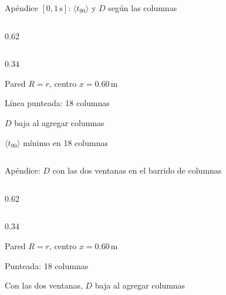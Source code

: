 \documentclass[aspectratio=169,10pt]{beamer}
\begin{document}
\begin{frame}[noframenumbering]{Apéndice $[0, 1\,\mathrm{s}]$: $\langle t_{90}\rangle$ y $D$ según las columnas}
  \begin{cols}
    \begin{column}{0.62\textwidth}
    \end{column}
    \begin{column}{0.34\textwidth}
      \begin{parametros}
        \item Pared $R = r$, centro $x = 0.60\,\mathrm{m}$
        \item Línea punteada: 18 columnas
      \end{parametros}
      \begin{resultado}
        \item $D$ baja al agregar columnas
        \item $\langle t_{90}\rangle$ mínimo en 18 columnas
      \end{resultado}
    \end{column}
  \end{cols}
\end{frame}

\begin{frame}[noframenumbering]{Apéndice: $D$ con las dos ventanas en el barrido de columnas}
  \begin{cols}
    \begin{column}{0.62\textwidth}
    \end{column}
    \begin{column}{0.34\textwidth}
      \begin{parametros}
        \item Pared $R = r$, centro $x = 0.60\,\mathrm{m}$
        \item Punteada: 18 columnas
      \end{parametros}
      \begin{resultado}
        \item Con las dos ventanas, $D$ baja al agregar columnas
      \end{resultado}
    \end{column}
  \end{cols}
\end{frame}
\end{document}
